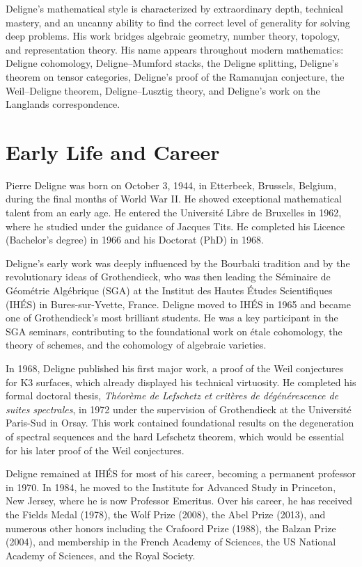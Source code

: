 Deligne's mathematical style is characterized by extraordinary depth, technical mastery, and an uncanny ability to find the correct level of generality for solving deep problems. His work bridges algebraic geometry, number theory, topology, and representation theory. His name appears throughout modern mathematics: Deligne cohomology, Deligne--Mumford stacks, the Deligne splitting, Deligne's theorem on tensor categories, Deligne's proof of the Ramanujan conjecture, the Weil--Deligne theorem, Deligne--Lusztig theory, and Deligne's work on the Langlands correspondence.

\section{Early Life and Career}

Pierre Deligne was born on October 3, 1944, in Etterbeek, Brussels, Belgium, during the final months of World War II. He showed exceptional mathematical talent from an early age. He entered the Universit\'e Libre de Bruxelles in 1962, where he studied under the guidance of Jacques Tits. He completed his Licence (Bachelor's degree) in 1966 and his Doctorat (PhD) in 1968.

Deligne's early work was deeply influenced by the Bourbaki tradition and by the revolutionary ideas of Grothendieck, who was then leading the S\'eminaire de G\'eom\'etrie Alg\'ebrique (SGA) at the Institut des Hautes \'Etudes Scientifiques (IH\'ES) in Bures-sur-Yvette, France. Deligne moved to IH\'ES in 1965 and became one of Grothendieck's most brilliant students. He was a key participant in the SGA seminars, contributing to the foundational work on \'etale cohomology, the theory of schemes, and the cohomology of algebraic varieties.

In 1968, Deligne published his first major work, a proof of the Weil conjectures for K3 surfaces, which already displayed his technical virtuosity. He completed his formal doctoral thesis, \textit{Th\'eor\`eme de Lefschetz et crit\`eres de d\'eg\'en\'erescence de suites spectrales}, in 1972 under the supervision of Grothendieck at the Universit\'e Paris-Sud in Orsay. This work contained foundational results on the degeneration of spectral sequences and the hard Lefschetz theorem, which would be essential for his later proof of the Weil conjectures.

Deligne remained at IH\'ES for most of his career, becoming a permanent professor in 1970. In 1984, he moved to the Institute for Advanced Study in Princeton, New Jersey, where he is now Professor Emeritus. Over his career, he has received the Fields Medal (1978), the Wolf Prize (2008), the Abel Prize (2013), and numerous other honors including the Crafoord Prize (1988), the Balzan Prize (2004), and membership in the French Academy of Sciences, the US National Academy of Sciences, and the Royal Society.

